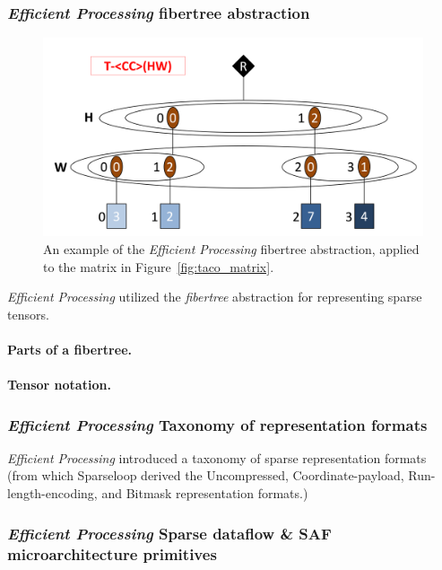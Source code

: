 \subsubsection{\textit{Efficient Processing} fibertree abstraction}

\begin{figure}[H]
\includegraphics[width=\textwidth]{figures/efficient_processing_fibertree.png}
\caption{An example of the \textit{Efficient Processing} fibertree abstraction, applied to the matrix in Figure~\ref{fig:taco_matrix}.}
\label{fig:efficient_processing_fibertree}
\end{figure}



\textit{Efficient Processing} utilized the \textit{fibertree} abstraction for representing sparse tensors.

\paragraph{Parts of a fibertree.}

\paragraph{Tensor notation.}

\subsubsection{\textit{Efficient Processing} Taxonomy of representation formats}

\textit{Efficient Processing} introduced a taxonomy of sparse representation formats (from which Sparseloop\cite{sparseloop}
derived the Uncompressed, Coordinate-payload, Run-length-encoding, and Bitmask representation formats.) 

\subsubsection{\textit{Efficient Processing} Sparse dataflow \& SAF microarchitecture primitives}

